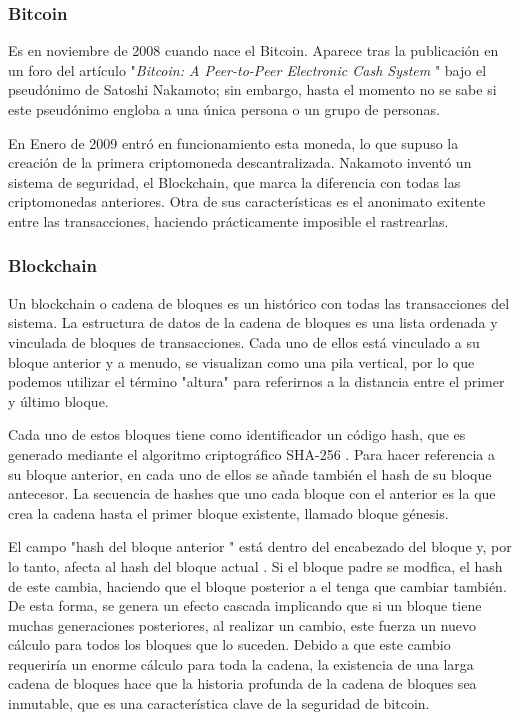 \documentclass[11pt]{article} %
\begin{document}
\subsubsection{Bitcoin}

Es en noviembre de 2008 cuando nace el Bitcoin. Aparece tras la publicación en un foro del artículo "\textit{Bitcoin: A Peer-to-Peer Electronic Cash System }" \cite{nakamoto} bajo el pseudónimo de Satoshi Nakamoto; sin embargo, hasta el momento no se sabe si este pseudónimo engloba a una única persona o un grupo de personas. 

En Enero de 2009 entró en funcionamiento esta moneda, lo que supuso la creación de la primera criptomoneda descantralizada. Nakamoto inventó un sistema de seguridad, el Blockchain, que marca la diferencia con todas las criptomonedas anteriores. Otra de sus características es el anonimato exitente entre las transacciones, haciendo prácticamente imposible el rastrearlas.
 
\subsubsection{Blockchain}

Un blockchain o cadena de bloques es un histórico con todas las transacciones del sistema. La estructura de datos de la cadena de bloques es una lista ordenada y vinculada de bloques de transacciones. Cada uno de ellos está vinculado a su bloque anterior y a menudo, se visualizan como una pila vertical, por lo que podemos utilizar el término "\textit{}altura" para referirnos a la distancia entre el primer y último bloque.


Cada uno de estos bloques tiene como identificador un código hash, que es generado mediante el algoritmo criptográfico SHA-256 \cite{sha}. Para hacer referencia a su bloque anterior, en cada uno de ellos se añade también el hash de su bloque antecesor. La secuencia de hashes que uno cada bloque con el anterior es la que crea la cadena hasta el primer bloque existente, llamado bloque génesis.

El campo "hash del bloque anterior "\textit{} está dentro del encabezado del bloque y, por lo tanto, afecta al hash del bloque actual . Si el bloque padre se modfica, el hash de este cambia, haciendo que el bloque posterior a el tenga que cambiar también. De esta forma, se genera un efecto cascada implicando que si un bloque tiene muchas generaciones posteriores, al realizar un cambio, este fuerza un nuevo cálculo para todos los bloques que lo suceden. Debido a que este cambio requeriría un enorme cálculo para toda la cadena, la existencia de una larga cadena de bloques hace que la historia profunda de la cadena de bloques sea inmutable, que es una característica clave de la seguridad de bitcoin.
\end{document}
